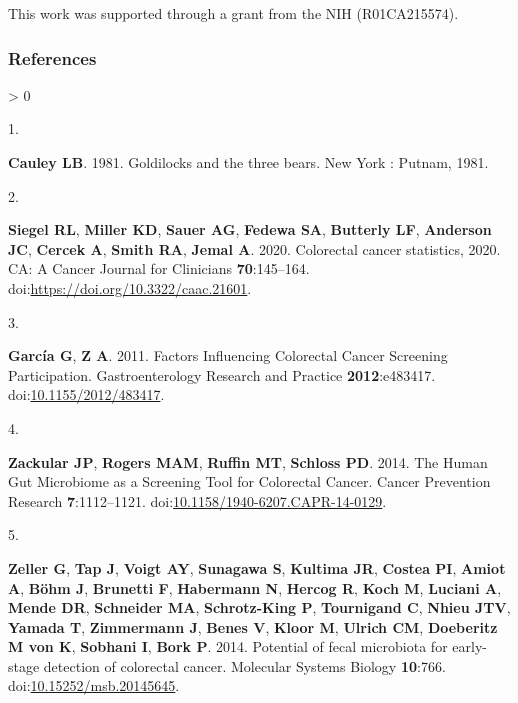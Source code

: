 \documentclass[
]{article}
\newlength{\cslhangindent}
\newlength{\csllabelwidth}
\newenvironment{CSLReferences}[2] %
 {%
  \setlength{\parindent}{0pt}
  \ifodd #1 \everypar{\setlength{\hangindent}{\cslhangindent}}\ignorespaces\fi
  \ifnum #2 > 0
  \setlength{\parskip}{#2\baselineskip}
  \fi
 }%
 {}
\newcommand{\CSLLeftMargin}[1]{\parbox[t]{\csllabelwidth}{#1}}
\newcommand{\CSLRightInline}[1]{\parbox[t]{\linewidth - \csllabelwidth}{#1}\break}
\begin{document}
This work was supported through a grant from the NIH (R01CA215574).

\newpage

\hypertarget{references}{%
\subsubsection{References}\label{references}}

\setlength{\parindent}{-0.25in}
\setlength{\leftskip}{0.25in}

\noindent

\hypertarget{refs}{}
\begin{CSLReferences}{0}{0}
\leavevmode\hypertarget{ref-cauley1981}{}%
\CSLLeftMargin{1. }
\CSLRightInline{\textbf{Cauley LB}. 1981. Goldilocks and the three
bears. New York : Putnam, 1981.}

\leavevmode\hypertarget{ref-siegel2020}{}%
\CSLLeftMargin{2. }
\CSLRightInline{\textbf{Siegel RL}, \textbf{Miller KD}, \textbf{Sauer
AG}, \textbf{Fedewa SA}, \textbf{Butterly LF}, \textbf{Anderson JC},
\textbf{Cercek A}, \textbf{Smith RA}, \textbf{Jemal A}. 2020. Colorectal
cancer statistics, 2020. CA: A Cancer Journal for Clinicians
\textbf{70}:145--164. doi:\url{https://doi.org/10.3322/caac.21601}.}

\leavevmode\hypertarget{ref-garcuxeda2011}{}%
\CSLLeftMargin{3. }
\CSLRightInline{\textbf{García G}, \textbf{Z A}. 2011. Factors
Influencing Colorectal Cancer Screening Participation. Gastroenterology
Research and Practice \textbf{2012}:e483417.
doi:\href{https://doi.org/10.1155/2012/483417}{10.1155/2012/483417}.}

\leavevmode\hypertarget{ref-zackular2014}{}%
\CSLLeftMargin{4. }
\CSLRightInline{\textbf{Zackular JP}, \textbf{Rogers MAM},
\textbf{Ruffin MT}, \textbf{Schloss PD}. 2014. The Human Gut Microbiome
as a Screening Tool for Colorectal Cancer. Cancer Prevention Research
\textbf{7}:1112--1121.
doi:\href{https://doi.org/10.1158/1940-6207.CAPR-14-0129}{10.1158/1940-6207.CAPR-14-0129}.}

\leavevmode\hypertarget{ref-zeller2014}{}%
\CSLLeftMargin{5. }
\CSLRightInline{\textbf{Zeller G}, \textbf{Tap J}, \textbf{Voigt AY},
\textbf{Sunagawa S}, \textbf{Kultima JR}, \textbf{Costea PI},
\textbf{Amiot A}, \textbf{Böhm J}, \textbf{Brunetti F},
\textbf{Habermann N}, \textbf{Hercog R}, \textbf{Koch M},
\textbf{Luciani A}, \textbf{Mende DR}, \textbf{Schneider MA},
\textbf{Schrotz-King P}, \textbf{Tournigand C}, \textbf{Nhieu JTV},
\textbf{Yamada T}, \textbf{Zimmermann J}, \textbf{Benes V},
\textbf{Kloor M}, \textbf{Ulrich CM}, \textbf{Doeberitz M von K},
\textbf{Sobhani I}, \textbf{Bork P}. 2014. Potential of fecal microbiota
for early-stage detection of colorectal cancer. Molecular Systems
Biology \textbf{10}:766.
doi:\href{https://doi.org/10.15252/msb.20145645}{10.15252/msb.20145645}.}


\end{CSLReferences}
\end{document}
